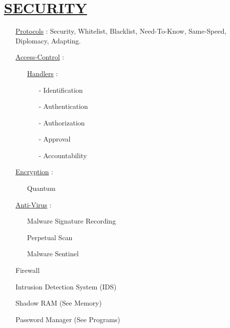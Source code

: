 \documentclass[11pt]{article}
\begin{document}
\section*{\ul{SECURITY}}
\begin{enumerate}
	\item[] \ul{Protocols} : Security, Whitelist, Blacklist, Need-To-Know, Same-Speed, Diplomacy, Adapting.
	
	\item[] \ul{Access-Control} :
	\begin{enumerate}
		\item[] \ul{Handlers} :
		\begin{enumerate}
			\item[-] Identification
			\item[-] Authentication
			\item[-] Authorization
			\item[-] Approval
			\item[-] Accountability
		\end{enumerate}
	\end{enumerate}
	
	\item[] \ul{Encryption} :
	\begin{enumerate}
		\item[] Quantum
	\end{enumerate}
	
	\item[] \ul{Anti-Virus} :
	\begin{enumerate}
		\item[] Malware Signature Recording
		\item[] Perpetual Scan
		\item[] Malware Sentinel
	\end{enumerate}
	\item[] Firewall
	\item[] Intrusion Detection System (IDS)
	\item[] Shadow RAM (See Memory)
	\item[] Password Manager (See Programs)
\end{enumerate}
\end{document}
